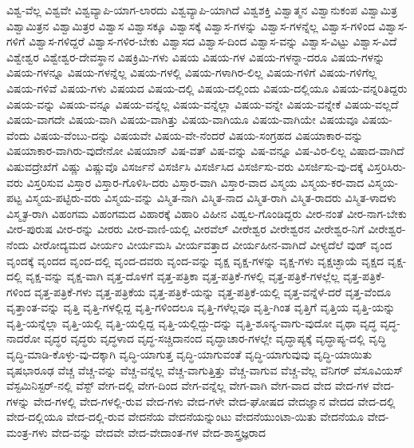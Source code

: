 {ವಿಶ್ವ-ವೆಲ್ಲ
ವಿಶ್ವವೇ
ವಿಶ್ವವ್ಯಾಪಿ-ಯಾಗ-ಲಾರದು
ವಿಶ್ವವ್ಯಾಪಿ-ಯಾಗಿದೆ
ವಿಶ್ವಶಕ್ತಿ
ವಿಶ್ವಾತ್ಮನ
ವಿಶ್ವಾನುಕಂಪ
ವಿಶ್ವಾಮಿತ್ರ
ವಿಶ್ವಾಮಿತ್ರನ
ವಿಶ್ವಾಮಿತ್ರರ
ವಿಶ್ವಾಸ
ವಿಶ್ವಾಸಕ್ಕೂ
ವಿಶ್ವಾಸಕ್ಕೆ
ವಿಶ್ವಾಸ-ಗಳನ್ನು
ವಿಶ್ವಾಸ-ಗಳನ್ನೆಲ್ಲ
ವಿಶ್ವಾಸ-ಗಳಿಂದ
ವಿಶ್ವಾಸ-ಗಳಿಗೆ
ವಿಶ್ವಾಸ-ಗಳಿದ್ದರೆ
ವಿಶ್ವಾಸ-ಗಳಿರ-ಬೇಕು
ವಿಶ್ವಾಸದ
ವಿಶ್ವಾಸ-ದಿಂದ
ವಿಶ್ವಾಸ-ವನ್ನು
ವಿಶ್ವಾಸ-ವಿಟ್ಟು
ವಿಶ್ವಾಸ-ವಿದೆ
ವಿಶ್ವೇಶ್ವರ
ವಿಶ್ವೇಶ್ವರ-ದೇವಸ್ಥಾನ
ವಿಷಕ್ರಿಮಿ-ಗಳು
ವಿಷಯ
ವಿಷಯ-ಗಳ
ವಿಷಯ-ಗಳನ್ನಾ-ದರೂ
ವಿಷಯ-ಗಳನ್ನು
ವಿಷಯ-ಗಳನ್ನೂ
ವಿಷಯ-ಗಳನ್ನೆಲ್ಲ
ವಿಷಯ-ಗಳಲ್ಲಿ
ವಿಷಯ-ಗಳಾಗಿರ-ಲಿಲ್ಲ
ವಿಷಯ-ಗಳಿಗೆ
ವಿಷಯ-ಗಳಿಗೆಲ್ಲ
ವಿಷಯ-ಗಳಿವೆ
ವಿಷಯ-ಗಳು
ವಿಷಯದ
ವಿಷಯ-ದಲ್ಲಿ
ವಿಷಯ-ದಲ್ಲಿಂದು
ವಿಷಯ-ದಲ್ಲಿಯೂ
ವಿಷಯ-ವನ್ನರಿತಿದ್ದರು
ವಿಷಯ-ವನ್ನು
ವಿಷಯ-ವನ್ನೂ
ವಿಷಯ-ವನ್ನೆಲ್ಲ
ವಿಷಯ-ವನ್ನೆಲ್ಲಾ
ವಿಷಯ-ವನ್ನೇ
ವಿಷಯ-ವನ್ನೇಕೆ
ವಿಷಯ-ವಲ್ಲದೆ
ವಿಷಯ-ವಾಗದೇ
ವಿಷಯ-ವಾಗಿ
ವಿಷಯ-ವಾಗಿತ್ತು
ವಿಷಯ-ವಾಗಿಯೂ
ವಿಷಯ-ವಾಗಿಯೇ
ವಿಷಯವೂ
ವಿಷಯ-ವೆಂದು
ವಿಷಯ-ವೆಂಬು-ದನ್ನು
ವಿಷಯವೇ
ವಿಷಯ-ವೇ-ನೆಂದರೆ
ವಿಷಯ-ಸಂಗ್ರಹದ
ವಿಷಯಾಕಾರ-ವನ್ನು
ವಿಷಯಾಕಾರ-ವಾಗಿರು-ವುದೇನೋ
ವಿಷಯಾನ್
ವಿಷ-ವತ್
ವಿಷ-ವನ್ನು
ವಿಷ-ವನ್ನೂ
ವಿಷ-ವಿರ-ಲಿಲ್ಲ
ವಿಷಾದ-ವಾಗಿದೆ
ವಿಷುವದ್ರೇಖೆಗೆ
ವಿಷ್ಣು
ವಿಷ್ಣುವೊ
ವಿಸರ್ಜನೆ
ವಿಸರ್ಜಿಸಿ
ವಿಸರ್ಜಿಸಿದ
ವಿಸರ್ಜಿಸು-ವರು
ವಿಸರ್ಜಿಸು-ವು-ದಕ್ಕೆ
ವಿಸ್ತರಿಸಿರು-ವರು
ವಿಸ್ತರಿಸುವ
ವಿಸ್ತಾರ
ವಿಸ್ತಾರ-ಗೊಳಿಸಿ-ದರು
ವಿಸ್ತಾರ-ವಾಗಿ
ವಿಸ್ತಾರ-ವಾದ
ವಿಸ್ಮಯ
ವಿಸ್ಮಯ-ಕರ-ವಾದ
ವಿಸ್ಮಯ-ಪಟ್ಟ
ವಿಸ್ಮಯ-ಪಟ್ಟಿರು-ವರು
ವಿಸ್ಮಯ-ವನ್ನು
ವಿಸ್ಮಿತ-ನಾಗಿ
ವಿಸ್ಮಿತ-ನಾದ
ವಿಸ್ಮಿತ-ರಾಗಿ
ವಿಸ್ಮಿತ-ರಾದರು
ವಿಸ್ಮಿತ-ಳಾದಳು
ವಿಸ್ಮೃತ-ರಾಗಿ
ವಿಹಂಗಮ
ವಿಹಂಗಮದ
ವಿಹಾರಕ್ಕೆ
ವಿಹಾರಿ
ವಿಹೀನ
ವಿಹ್ವಲ-ಗೊಂಡಿದ್ದರು
ವೀರ-ನಂತೆ
ವೀರ-ನಾಗ-ಬೇಕು
ವೀರ-ಪುರುಷ
ವೀರ-ರನ್ನು
ವೀರರು
ವೀರ-ವಾಣಿ-ಯಲ್ಲಿ
ವೀರವೆಲ್
ವೀರೇಶ್ವರ
ವೀರೇಶ್ವರನ
ವೀರೇಶ್ವರ-ನಿಗೆ
ವೀರೇಶ್ವರ-ನೆಂದು
ವೀರೋದ್ಯಮದ
ವೀರ್ಯಂ
ವೀರ್ಯಮಸಿ
ವೀರ್ಯವತ್ತಾದ
ವೀರ್ಯಹೀನ-ವಾಗಿದೆ
ವೀಳ್ಯದೆಲೆ
ವುಡ್
ವೃಂದ
ವೃಂದಕ್ಕೆ
ವೃಂದದ
ವೃಂದ-ದಲ್ಲಿ
ವೃಂದ-ದವರು
ವೃಂದ-ವನ್ನು
ವೃಕ್ಷ
ವೃಕ್ಷ-ಗಳನ್ನು
ವೃಕ್ಷ-ಗಳು
ವೃಕ್ಷಚ್ಛಾಯೆ
ವೃಕ್ಷದ
ವೃಕ್ಷ-ದಲ್ಲಿ
ವೃಕ್ಷ-ವನ್ನು
ವೃಕ್ಷ-ವಾಗಿ
ವೃತ್ತ-ದೊಳಗೆ
ವೃತ್ತ-ಪತ್ರಿಕಾ
ವೃತ್ತ-ಪತ್ರಿಕೆ-ಗಳಲ್ಲಿ
ವೃತ್ತ-ಪತ್ರಿಕೆ-ಗಳಲ್ಲೆಲ್ಲ
ವೃತ್ತ-ಪತ್ರಿಕೆ-ಗಳಿಂದ
ವೃತ್ತ-ಪತ್ರಿಕೆ-ಗಳು
ವೃತ್ತ-ಪತ್ರಿಕೆಯ
ವೃತ್ತ-ಪತ್ರಿಕೆ-ಯನ್ನು
ವೃತ್ತ-ಪತ್ರಿಕೆ-ಯಲ್ಲಿ
ವೃತ್ತ-ವನ್ನೆಳೆ-ದರೆ
ವೃತ್ತ-ವೆಂದೂ
ವೃತ್ತಾಂತ-ವನ್ನು
ವೃತ್ತಿ
ವೃತ್ತಿ-ಗಳಲ್ಲಿದ್ದ
ವೃತ್ತಿ-ಗಳಿಂದಲೂ
ವೃತ್ತಿ-ಗಳೆಲ್ಲವೂ
ವೃತ್ತಿ-ಗಿಂತ
ವೃತ್ತಿಗೆ
ವೃತ್ತಿಯ
ವೃತ್ತಿ-ಯನ್ನು
ವೃತ್ತಿ-ಯನ್ನೆಲ್ಲಾ
ವೃತ್ತಿ-ಯಲ್ಲಿ
ವೃತ್ತಿ-ಯಲ್ಲಿದ್ದ
ವೃತ್ತಿ-ಯಲ್ಲಿದ್ದು-ದನ್ನು
ವೃತ್ತಿ-ಶೂನ್ಯ-ವಾಗು-ವುದೋ
ವೃಥಾ
ವೃದ್ಧ
ವೃದ್ಧ-ನಾದರೋ
ವೃದ್ಧರ
ವೃದ್ಧರು
ವೃದ್ಧಳಾದ
ವೃದ್ಧ-ಸಚ್ಚಿದಾನಂದ
ವೃದ್ಧಾಚಾರ-ಗಳಲ್ಲೇ
ವೃದ್ಧಾಪ್ಯಕ್ಕೆ
ವೃದ್ಧಾಪ್ಯ-ದಲ್ಲಿ
ವೃದ್ಧಿ
ವೃದ್ಧಿ-ಮಾಡಿ-ಕೊಳ್ಳು-ವು-ದಕ್ಕಾಗಿ
ವೃದ್ಧಿ-ಯಾಗುತ್ತ
ವೃದ್ಧಿ-ಯಾಗುವಂತೆ
ವೃದ್ಧಿ-ಯಾಗುವುವು
ವೃದ್ಧಿ-ಯಾಯಿತು
ವೃಷಭಾರೂಢ
ವೆಚ್ಚ
ವೆಚ್ಚ-ವನ್ನು
ವೆಚ್ಚ-ವನ್ನೆಲ್ಲ
ವೆಚ್ಚ-ವಾಗುತ್ತಿತ್ತು
ವೆಚ್ಚ-ವಾಗುವ
ವೆಚ್ಚ-ವೆಲ್ಲ
ವೆನಿಗರ್
ವೆಸೂವಿಯಸ್
ವೆಸ್ಟಮಿನಿಸ್ಟರ್-ನಲ್ಲಿ
ವೆಸ್ಟ್
ವೇಗ-ದಲ್ಲಿ
ವೇಗ-ದಿಂದ
ವೇಗ-ವನ್ನೆಲ್ಲ
ವೇಗ-ವಾಗಿ
ವೇಗ-ವಾದ
ವೇದ
ವೇದ-ಗಳ
ವೇದ-ಗಳನ್ನು
ವೇದ-ಗಳಲ್ಲಿ
ವೇದ-ಗಳಲ್ಲಿ-ರುವ
ವೇದ-ಗಳು
ವೇದ-ಗಳೇ
ವೇದ-ಘೋಷದ
ವೇದಜ್ಞಾನ
ವೇದದ
ವೇದ-ದಲ್ಲಿ
ವೇದ-ದಲ್ಲಿಯೂ
ವೇದ-ದಲ್ಲಿ-ರುವ
ವೇದನೆಯ
ವೇದನೆಯನ್ನುಂಟು
ವೇದನೆಯುಂಟಾ-ಯಿತು
ವೇದನೆಯೂ
ವೇದ-ಮಂತ್ರ-ಗಳು
ವೇದ-ವನ್ನು
ವೇದವೇ
ವೇದ-ವೇದಾಂತ-ಗಳ
ವೇದ-ಶಾಸ್ತ್ರಜ್ಞರಾದ
}
